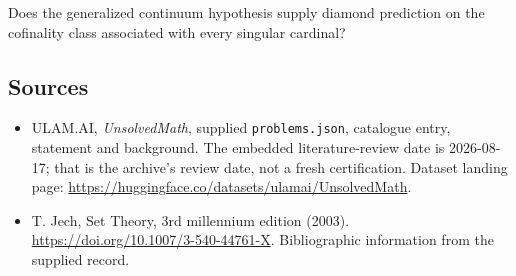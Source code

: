 \documentclass[11pt,a4paper]{article}
\begin{document}
Does the generalized continuum hypothesis supply diamond prediction on the cofinality class associated with every singular cardinal?

\subsection{Sources}

{\small

\begin{itemize}

\item[\hypertarget{source:statement:1}{S1}] ULAM.AI, \emph{UnsolvedMath}, supplied \texttt{problems.json}, catalogue entry, statement and background. The embedded literature-review date is 2026-08-17; that is the archive’s review date, not a fresh certification. Dataset landing page: \url{https://huggingface.co/datasets/ulamai/UnsolvedMath}.

\item[\hypertarget{source:statement:2}{S2}] T. Jech, Set Theory, 3rd millennium edition (2003). \url{https://doi.org/10.1007/3-540-44761-X}. Bibliographic information from the supplied record.

\end{itemize}

}

\label{end:statement}
\end{document}
